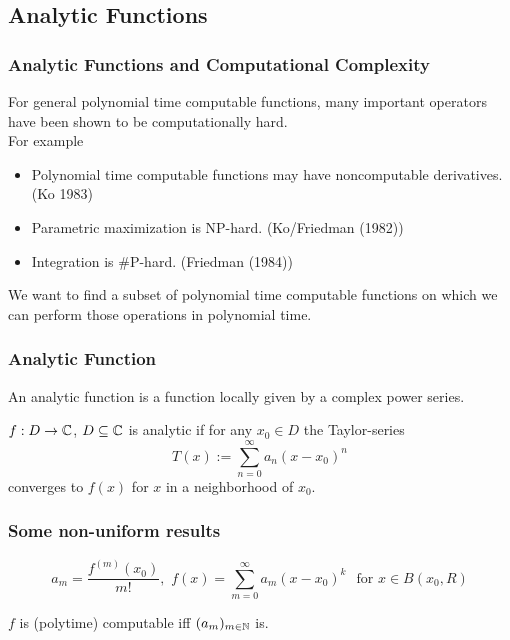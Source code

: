 
\subsection{Analytic Functions}
\begin{frame}
\frametitle{Analytic Functions and Computational Complexity}
\begin{fact}
For general polynomial time computable functions, many important operators have been shown to be computationally hard.\\
For example
\begin{itemize}[<+->]
\item Polynomial time computable functions may have noncomputable derivatives. (Ko 1983)
\item Parametric maximization is NP-hard. (Ko/Friedman (1982))
\item Integration is \#P-hard. (Friedman (1984))
\end{itemize}
\end{fact}
\pause
We want to find a subset of polynomial time computable functions on which we can perform those operations in polynomial time.
\end{frame}
\begin{frame}
\frametitle{Analytic Function}
An analytic function is a function locally given by a complex power series.\\
\begin{definition}
$f : D \to \mathbb{C} $, $D \subseteq \mathbb{C}$ is analytic if for any $x_0 \in D$ the Taylor-series
$$ T(x) := \sum^\infty_{n=0} a_n(x-x_0)^n$$
converges to $f(x)$ for $x$ in a neighborhood of $x_0$.  
\end{definition}
\end{frame}
\begin{frame}
\frametitle{Some non-uniform results}

$$a_m =\frac{f^{(m)}(x_0)}{m!} 
, \,\, f(x) = \sum_{m=0}^\infty a_m(x-x_0)^k \,\ \text{ for } x \in B(x_0,R)
$$
\vfill
\begin{theorem}
$f$ is (polytime) computable iff $(a_m)_{m \in \mathbb{N}}$ is.
\end{theorem}
\end{frame}
